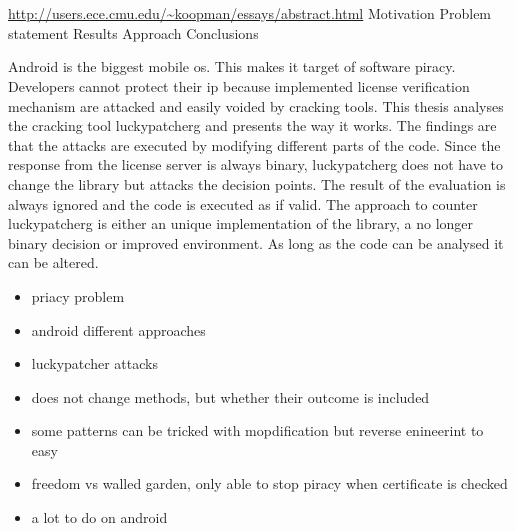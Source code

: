 \chapter{\abstractname}
\url{http://users.ece.cmu.edu/~koopman/essays/abstract.html}
Motivation
Problem statement
Results
Approach
Conclusions

Android is the biggest mobile \gls{os}.
This makes it target of software piracy.
Developers cannot protect their \gls{ip} because implemented license verification mechanism are attacked and easily voided by cracking tools.
This thesis analyses the cracking tool \gls{luckypatcherg} and presents the way it works.
The findings are that the attacks are executed by modifying different parts of the code.
Since the response from the license server is always binary, \gls{luckypatcherg} does not have to change the library but attacks the decision points.
The result of the evaluation is always ignored and the code is executed as if valid.
The approach to counter \gls{luckypatcherg} is either an unique implementation of the library, a no longer binary decision or improved environment.
As long as the code can be analysed it can be altered.

\begin{itemize}
  \item priacy problem
  \item android different approaches
  \item luckypatcher attacks
  \item does not change methods, but whether their outcome is included
  \item some patterns can be tricked with mopdification but reverse enineerint to easy
  \item freedom vs walled garden, only able to stop piracy when certificate is checked
  \item a lot to do on android
\end{itemize}
